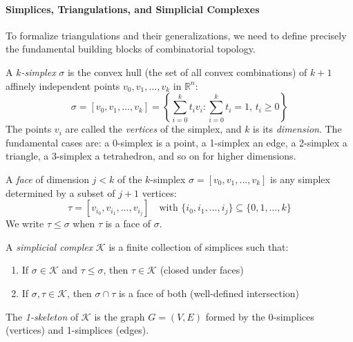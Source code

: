 \paragraph{Simplices, Triangulations, and Simplicial Complexes}

To formalize triangulations and their generalizations, we need to define precisely the fundamental building blocks of combinatorial topology.

\begin{definition}[$k$-simplex]\label{def:simplicio_gdl}
	A \textit{$k$-simplex} $\sigma$ is the convex hull (the set of all convex combinations) of $k+1$ affinely independent points $v_0, v_1, \ldots, v_k$ in $\mathbb{R}^n$:
	\[
		\sigma = [v_0, v_1, \ldots, v_k] = \left\{ \sum_{i=0}^k t_i v_i : \sum_{i=0}^k t_i = 1, \, t_i \geq 0 \right\}
	\]
	The points $v_i$ are called the \textit{vertices} of the simplex, and $k$ is its \textit{dimension}. The fundamental cases are: a 0-simplex is a point, a 1-simplex an edge, a 2-simplex a triangle, a 3-simplex a tetrahedron, and so on for higher dimensions.
\end{definition}

\begin{definition}\label{def:cara_simplicio_gdl}
	A \textit{face} of dimension $j < k$ of the $k$-simplex $\sigma = [v_0, v_1, \ldots, v_k]$ is any simplex determined by a subset of $j+1$ vertices:
	\[
		\tau = [v_{i_0}, v_{i_1}, \ldots, v_{i_j}] \quad \text{with } \{i_0, i_1, \ldots, i_j\} \subseteq \{0, 1, \ldots, k\}
	\]
	We write $\tau \leq \sigma$ when $\tau$ is a face of $\sigma$.
\end{definition}

\begin{definition}\label{def:complejo_simplicial}
	A \textit{simplicial complex} $\mathcal{K}$ is a finite collection of simplices such that:
	\begin{enumerate}
		\item If $\sigma \in \mathcal{K}$ and $\tau \leq \sigma$, then $\tau \in \mathcal{K}$ (closed under faces)
		\item If $\sigma, \tau \in \mathcal{K}$, then $\sigma \cap \tau$ is a face of both (well-defined intersection)
	\end{enumerate}

	The \textit{1-skeleton} of $\mathcal{K}$ is the graph $G = (V,E)$ formed by the 0-simplices (vertices) and 1-simplices (edges).
\end{definition}

